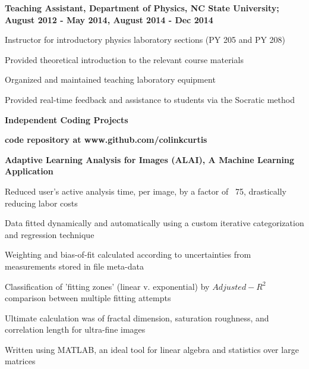 \documentclass[letterpaper,final]{memoir}
\newcommand{\LargeSep}{\vspace{1.3em}}
\newcommand{\Sep}{\vspace{1.0em}}
\newcommand{\SmallSep}{\vspace{0.4em}}
\newcommand{\CVSection}[1]
	{\LARGE\textbf{#1}\par
	\SmallSep\normalsize}
\newcommand{\CVItem}[1]
	{\textbf{\color{Blue} #1}}
\begin{document}
\CVItem{Teaching Assistant, Department of Physics, NC State University; August 2012 - May 2014, August 2014 - Dec 2014}
\begin{compactitem}[\color{Blue}$\circ$]

    \SmallSep
	
    \item Instructor for introductory physics laboratory sections (PY 205 and PY 208)
    \item Provided theoretical introduction to the relevant course materials
    \item Organized and maintained teaching laboratory equipment
    \item Provided real-time feedback and assistance to students via the Socratic method
\end{compactitem}

\LargeSep


\newpage

\notoserif \CVSection{Independent Coding Projects}

\normalfont

\Sep

\CVItem{code repository at www.github.com/colinkcurtis} 

\Sep

\CVItem{Adaptive Learning Analysis for Images (ALAI), A Machine Learning Application} 

\begin{compactitem}[\color{Blue}$\circ$]
   
    \SmallSep

    \item Reduced user's active analysis time, per image, by a factor of ~75, drastically reducing labor costs

    \item Data fitted dynamically and automatically using a custom iterative categorization and regression technique

    \item Weighting and bias-of-fit calculated according to uncertainties from measurements stored in file meta-data

    \item Classification of 'fitting zones' (linear v. exponential) by $Adjusted-R^2$ comparison between multiple fitting attempts

    \item Ultimate calculation was of fractal dimension, saturation roughness, and correlation length for ultra-fine images

    \item Written using MATLAB, an ideal tool for linear algebra and statistics over large matrices
    \Sep

\end{compactitem}
\end{document}
